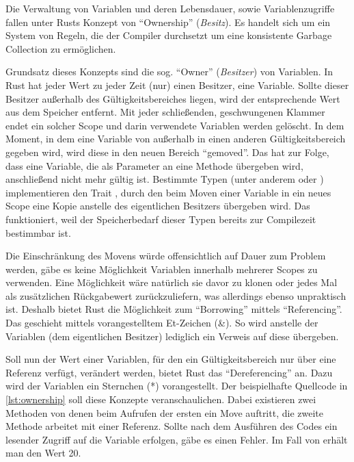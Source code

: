 Die Verwaltung von Variablen und deren Lebensdauer, sowie Variablenzugriffe fallen unter Rusts Konzept von \enquote{Ownership} (\textit{Besitz}). Es handelt sich um ein System von Regeln, die der Compiler durchsetzt um eine konsistente Garbage Collection zu ermöglichen.

Grundsatz dieses Konzepts sind die sog. \enquote{Owner} (\textit{Besitzer}) von Variablen. In Rust hat jeder Wert zu jeder Zeit (nur) einen Besitzer, eine Variable. Sollte dieser Besitzer außerhalb des Gültigkeitsbereiches liegen, wird der entsprechende Wert aus dem Speicher entfernt. Mit jeder schließenden, geschwungenen Klammer endet ein solcher Scope und darin verwendete Variablen werden gelöscht. In dem Moment, in dem eine Variable von außerhalb in einen anderen Gültigkeitsbereich gegeben wird, wird diese in den neuen Bereich \enquote{gemoved}. Das hat zur Folge, dass eine Variable, die als Parameter an eine Methode übergeben wird, anschließend nicht mehr gültig ist. Bestimmte Typen (unter anderem  oder ) implementieren den Trait , durch den beim Moven einer Variable in ein neues Scope eine Kopie anstelle des eigentlichen Besitzers übergeben wird. Das funktioniert, weil der Speicherbedarf dieser Typen bereits zur Compilezeit bestimmbar ist.

Die Einschränkung des Movens würde offensichtlich auf Dauer zum Problem werden, gäbe es keine Möglichkeit Variablen innerhalb mehrerer Scopes zu verwenden. Eine Möglichkeit wäre natürlich sie davor zu klonen oder jedes Mal als zusätzlichen Rückgabewert zurückzuliefern, was allerdings ebenso unpraktisch ist. Deshalb bietet Rust die Möglichkeit zum \enquote{Borrowing} mittels \enquote{Referencing}. Das geschieht mittels vorangestelltem Et-Zeichen (\&). So wird anstelle der Variablen (dem eigentlichen Besitzer) lediglich ein Verweis auf diese übergeben.

Soll nun der Wert einer Variablen, für den ein Gültigkeitsbereich nur über eine Referenz verfügt, verändert werden, bietet Rust das \enquote{Dereferencing} an. Dazu wird der Variablen ein Sternchen (*) vorangestellt. Der beispielhafte Quellcode in \ref{lst:ownership} soll diese Konzepte veranschaulichen. Dabei existieren zwei Methoden von denen beim Aufrufen der ersten ein Move auftritt, die zweite Methode arbeitet mit einer Referenz. Sollte nach dem Ausführen des Codes ein lesender Zugriff auf die Variable  erfolgen, gäbe es einen Fehler. Im Fall von  erhält man den Wert 20.

